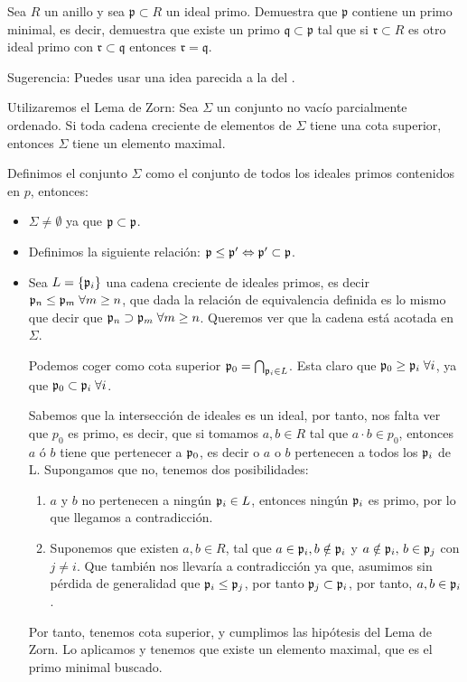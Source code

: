 \begin{problem} Sea $R$ un anillo y sea $\mathfrak{p} ⊂ R$ un ideal primo. Demuestra que $\mathfrak{p}$ contiene un primo minimal, es decir, demuestra que existe un primo $\mathfrak{q} ⊂ \mathfrak{p}$ tal que si $\mathfrak{r} ⊂ R$ es otro ideal primo con $\mathfrak{r} ⊂ \mathfrak{q}$ entonces $\mathfrak{r} = \mathfrak{q}$.

\textup{Sugerencia: Puedes usar una idea parecida a la del }.

\solution
{}

Utilizaremos el Lema de Zorn: Sea $\Sigma$ un conjunto no vacío parcialmente ordenado. Si toda cadena creciente de elementos de $\Sigma$ tiene una cota superior, entonces $\Sigma$ tiene un elemento maximal.

Definimos el conjunto $\Sigma$ como el conjunto de todos los ideales primos contenidos en $p$, entonces:
\begin{itemize}
	\item $\Sigma \neq \emptyset$ ya que $\mathfrak{p} \subset \mathfrak{p}$.
	\item Definimos la siguiente relación: $\mathfrak{p} \leq \mathfrak{p}' \Leftrightarrow \mathfrak{p}' \subset \mathfrak{p}$.
	\item Sea $L=\{\mathfrak{p}_i\}$ una cadena creciente de ideales primos, es decir $\mathfrak{p}_n \leq \mathfrak{p}_m\; \forall m \geq n$, que dada la relación de equivalencia definida es lo mismo que decir que $\mathfrak{p}_n \supset \mathfrak{p}_m\; \forall m \geq n$. Queremos ver que la cadena está acotada en $\Sigma$.

	Podemos coger como cota superior $\mathfrak{p}_0=\bigcap_{\mathfrak{p}_i\in L}$. Esta claro que $\mathfrak{p}_0 \geq \mathfrak{p}_i\; \forall i$, ya que $\mathfrak{p}_0 \subset \mathfrak{p}_i\;  \forall i$.

	Sabemos que la intersección de ideales es un ideal, por tanto, nos falta ver que $p_0$ es primo, es decir, que si tomamos $a,b \in R$ tal que $a\cdot b \in p_0$, entonces $a$ ó $b$ tiene que pertenecer a $\mathfrak{p}_0$, es decir o $a$ o $b$ pertenecen a todos los $\mathfrak{p}_i$ de L. Supongamos que no, tenemos dos posibilidades:
	\begin{enumerate}
		\item $a$ y $b$ no pertenecen a ningún $\mathfrak{p}_i \in L$, entonces ningún $\mathfrak{p}_i$ es primo, por lo que llegamos a contradicción.
		\item Suponemos que existen $a,b\in R$, tal que $a \in \mathfrak{p}_i, b \notin \mathfrak{p}_i$ y $a \notin \mathfrak{p}_i,\, b \in \mathfrak{p}_j$ con $j \neq i$. Que también nos llevaría a contradicción ya que, asumimos sin pérdida de generalidad que $\mathfrak{p}_i \leq \mathfrak{p}_j$, por tanto $\mathfrak{p}_j \subset \mathfrak{p}_i$, por tanto, $a,b \in \mathfrak{p}_i$.
	\end{enumerate}

	Por tanto, tenemos cota superior, y cumplimos las hipótesis del Lema de Zorn. Lo aplicamos y tenemos que existe un elemento maximal, que es el primo minimal buscado.
\end{itemize}


\end{problem}


